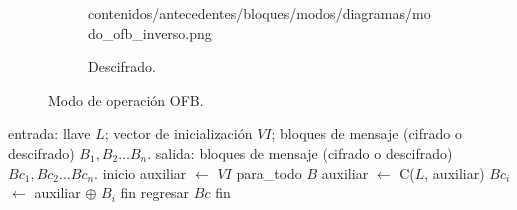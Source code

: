 \begin{figure}[H]
\begin{subfigure}{0.45\textwidth}
\begin{center}
            {contenidos/antecedentes/bloques/modos/diagramas/modo_ofb_inverso.png}
          \caption{Descifrado.}
      \end{center}
  \end{subfigure}
  \caption{Modo de operación OFB.}
\end{figure}

\begin{pseudocodigo}[caption={Modo de operación OFB (cifrado y descifrado).}]
  entrada: llave $ L $; vector de inicialización $ VI $;
           bloques de mensaje (cifrado o descifrado) $ B_1, B_2 \dots B_n $.
   salida: bloques de mensaje (cifrado o descifrado) $ Bc_1, Bc_2 \dots Bc_n $.
  inicio
    auxiliar $\gets$ $ VI $
    para_todo $B$
      auxiliar $\gets$ C($L$, auxiliar)
      $Bc_i$ $\gets$  auxiliar $\oplus$ $B_i$
    fin
    regresar $Bc$
  fin
\end{pseudocodigo}
